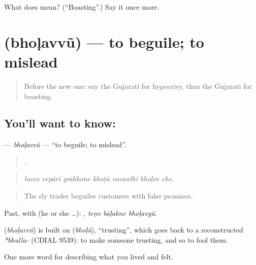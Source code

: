\begin{tcolorbox}[breakable,colback=teal!4,colframe=teal!35!black,title={Before you move on}]
What does  mean? (\textquotedblleft{}Boasting\textquotedblright{}.) Say it once more.
\end{tcolorbox}
\section[\texorpdfstring{\gu{ભોળવવું} (bhoḷavvũ)}{ભોળવવું (bhoḷavvũ)}]{ (bhoḷavvũ) — to beguile; to mislead}

\label{lesson:GU-C468-bholavvu}



\begin{quote}
Before the new one: say the Gujarati for hypocrisy, then the Gujarati for boasting.
\end{quote}

\subsection*{You'll want to know: }
\textbf{} — \emph{bhoḷavvũ} — \textquotedblleft{}to beguile; to mislead\textquotedblright{}.

\begin{quote}
      .
\end{quote}

\begin{quote}
\emph{lucco vepārī grāhkone khoṭā vacanthī bhoḷve che.}
\end{quote}

\begin{quote}
The sly trader beguiles customers with false promises.
\end{quote}

Past, with  (he or she …):   , \emph{teṇe bāḷakne bhoḷavyũ}.

\begin{cousinweb}
\textbf{} (\emph{bhoḷavvũ}) is built on \textbf{} (\emph{bhoḷũ}), \textquotedblleft{}trusting\textquotedblright{}, which goes back to a reconstructed \emph{*bhulla-} (CDIAL 9539): to make someone trusting, and so to fool them.
\end{cousinweb}

\begin{grammarlens}[title={What you've built}]
One more word for describing what you lived and felt.
\end{grammarlens}

